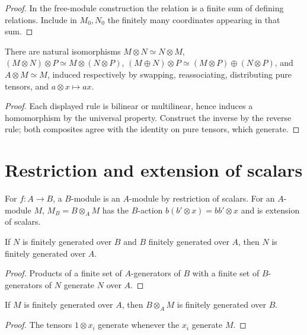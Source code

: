 \begin{proof}
In the free-module construction the relation is a finite sum of defining
relations.  Include in $M_0,N_0$ the finitely many coordinates appearing in
that sum.
\end{proof}
\begin{proposition}
\label{am-prop-2-14}
\uses{}
There are natural isomorphisms $M\otimes N\simeq N\otimes M$,
$(M\otimes N)\otimes P\simeq M\otimes(N\otimes P)$,
$(M\oplus N)\otimes P\simeq(M\otimes P)\oplus(N\otimes P)$, and
$A\otimes M\simeq M$, induced respectively by swapping, reassociating,
distributing pure tensors, and $a\otimes x\mapsto ax$.
\end{proposition}
\begin{proof}
Each displayed rule is bilinear or multilinear, hence induces a homomorphism
by the universal property.  Construct the inverse by the reverse rule; both
composites agree with the identity on pure tensors, which generate.
\end{proof}

\section{Restriction and extension of scalars}
\label{am-ch2-scalars}
\begin{definition}
\label{am-def-scalars}
\uses{}
For $f:A\to B$, a $B$-module is an $A$-module by restriction of scalars.  For
an $A$-module $M$, $M_B=B\otimes_A M$ has the $B$-action
$b(b'\otimes x)=bb'\otimes x$ and is extension of scalars.
\end{definition}
\begin{proposition}
\label{am-prop-2-16}
\uses{}
If $N$ is finitely generated over $B$ and $B$ finitely generated over $A$, then
$N$ is finitely generated over $A$.
\end{proposition}
\begin{proof}
Products of a finite set of $A$-generators of $B$ with a finite set of
$B$-generators of $N$ generate $N$ over $A$.
\end{proof}
\begin{proposition}
\label{am-prop-2-17}
\uses{}
If $M$ is finitely generated over $A$, then $B\otimes_A M$ is finitely generated
over $B$.
\end{proposition}
\begin{proof}
The tensors $1\otimes x_i$ generate whenever the $x_i$ generate $M$.
\end{proof}

